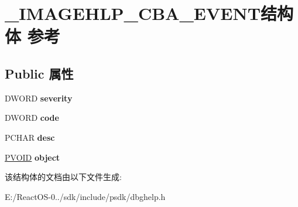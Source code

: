 \hypertarget{struct___i_m_a_g_e_h_l_p___c_b_a___e_v_e_n_t}{}\section{\+\_\+\+I\+M\+A\+G\+E\+H\+L\+P\+\_\+\+C\+B\+A\+\_\+\+E\+V\+E\+N\+T结构体 参考}
\label{struct___i_m_a_g_e_h_l_p___c_b_a___e_v_e_n_t}
\subsection*{Public 属性}
\begin{DoxyCompactItemize}
\item 
\mbox{\label{struct___i_m_a_g_e_h_l_p___c_b_a___e_v_e_n_t_afb28b53e69c5ad9256d9621d1bddb7b3}} 
D\+W\+O\+RD {\bfseries severity}
\item 
\mbox{\label{struct___i_m_a_g_e_h_l_p___c_b_a___e_v_e_n_t_ac55b48f2c410f5df69089300f19ff39d}} 
D\+W\+O\+RD {\bfseries code}
\item 
\mbox{\label{struct___i_m_a_g_e_h_l_p___c_b_a___e_v_e_n_t_a9f094b004ded9e9aadbe5745c904970f}} 
P\+C\+H\+AR {\bfseries desc}
\item 
\mbox{\label{struct___i_m_a_g_e_h_l_p___c_b_a___e_v_e_n_t_a9c81e47cf40c29f43f090a72e835f82d}} 
\hyperlink{interfacevoid}{P\+V\+O\+ID} {\bfseries object}
\end{DoxyCompactItemize}


该结构体的文档由以下文件生成\+:\begin{DoxyCompactItemize}
\item 
E\+:/\+React\+O\+S-\/0../sdk/include/psdk/dbghelp.\+h\end{DoxyCompactItemize}
